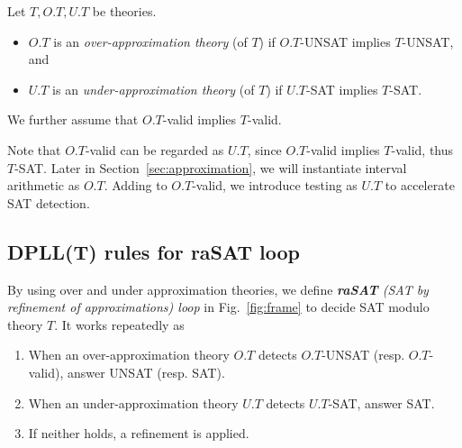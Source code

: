 \documentclass[runningheads,a4paper,oribibl]{llncs}
\begin{document}
\begin{definition} \label{def:ApproxTheory}
Let $T, O.T, U.T$ be theories. 
\begin{itemize}
\item $O.T$ is an {\em over-approximation theory} (of $T$) 
if $O.T$-UNSAT implies $T$-UNSAT, and
\item $U.T$ is an {\em under-approximation theory} (of $T$)
if $U.T$-SAT implies $T$-SAT. 
\end{itemize}
We further assume that $O.T$-valid implies $T$-valid. 
\end{definition}

Note that $O.T$-valid can be regarded as $U.T$, since $O.T$-valid implies $T$-valid, thus $T$-SAT. 
Later in Section~\ref{sec:approximation}, we will instantiate interval arithmetic as $O.T$. 
Adding to $O.T$-valid, we introduce testing as $U.T$ to accelerate SAT detection. 



\subsection{DPLL(T) rules for {\bf raSAT} loop} \label{subsec:rasatloop}


By using over and under approximation theories, we define {\em {\bf raSAT} 
(SAT by refinement of approximations) loop} in Fig.~\ref{fig:frame} 
to decide SAT modulo theory $T$. 
%
It works repeatedly as 
\begin{enumerate}
\item When an over-approximation theory $O.T$ detects $O.T$-UNSAT (resp. $O.T$-valid), answer UNSAT (resp. SAT). 
\item When an under-approximation theory $U.T$ detects $U.T$-SAT, answer SAT. 
\item If neither holds, a refinement is applied. 
\end{enumerate}
\end{document}
